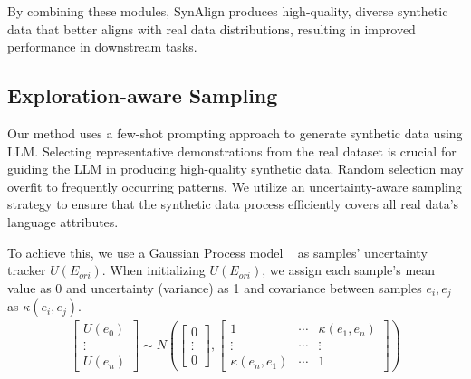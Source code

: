 By combining these modules, SynAlign produces high-quality, diverse synthetic data that better aligns with real data distributions, resulting in improved performance in downstream tasks.


\subsection{Exploration-aware Sampling}

Our method uses a few-shot prompting approach to generate synthetic data using LLM. Selecting representative demonstrations from the real dataset is crucial for guiding the LLM in producing high-quality synthetic data. Random selection may overfit to frequently occurring patterns. We utilize an uncertainty-aware sampling strategy to ensure that the synthetic data process efficiently covers all real data's language attributes.


To achieve this, we use a Gaussian Process model ~\cite{williams1995gaussian} as samples' uncertainty tracker $U(E_{ori})$. When initializing $U(E_{ori})$, we assign each sample's mean value as 0 and uncertainty (variance) as 1 and covariance between samples $e_i, e_j$ as $\kappa(e_i, e_j)$.
\begin{align}
                    \left[\begin{array}{c}
                    U\left(e_0\right) \\
                    \vdots \\
                    U\left(e_n\right)
                    \end{array}\right] \sim N\left(\left[\begin{array}{c}
                    0 \\
                    \vdots \\
                    0
                    \end{array}\right],\left[\begin{array}{ccc}
                    1 & \cdots & \kappa\left(e_1, e_n\right) \\
                    \vdots & \cdots & \vdots \\
                    \kappa\left(e_n, e_1\right) & \cdots & 1
                    \end{array}\right]\right) 
\end{align}

